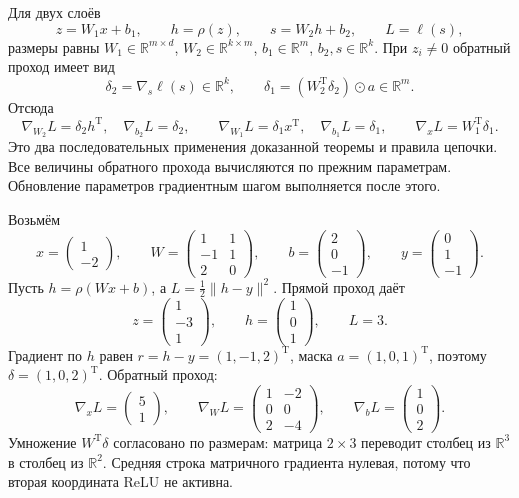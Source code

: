 Для двух слоёв
\[
 z=W_1x+b_1,\qquad h=\rho(z),\qquad s=W_2h+b_2,\qquad L=\ell(s),
\]
размеры равны
\(W_1\in\mathbb R^{m\times d}\), \(W_2\in\mathbb R^{k\times m}\),
\(b_1\in\mathbb R^m\), \(b_2,s\in\mathbb R^k\).
При \(z_i\ne0\) обратный проход имеет вид
\[
 \delta_2=\nabla_s\ell(s)\in\mathbb R^k,\qquad
 \delta_1=(W_2^{\mathrm T}\delta_2)\odot a\in\mathbb R^m.
\]
Отсюда
\[
 \nabla_{W_2}L=\delta_2h^{\mathrm T},\quad \nabla_{b_2}L=\delta_2,\qquad
 \nabla_{W_1}L=\delta_1x^{\mathrm T},\quad \nabla_{b_1}L=\delta_1,\qquad
 \nabla_xL=W_1^{\mathrm T}\delta_1.
\]
Это два последовательных применения доказанной теоремы и правила цепочки.
Все величины обратного прохода вычисляются по прежним параметрам.
Обновление параметров градиентным шагом выполняется после этого.

\begin{example}
Возьмём
\[
 x=\begin{pmatrix}1\\-2\end{pmatrix},\qquad
 W=\begin{pmatrix}1&1\\-1&1\\2&0\end{pmatrix},\qquad
 b=\begin{pmatrix}2\\0\\-1\end{pmatrix},\qquad
 y=\begin{pmatrix}0\\1\\-1\end{pmatrix}.
\]
Пусть \(h=\rho(Wx+b)\), а \(L=\frac{1}{2}\|h-y\|^2\).
Прямой проход даёт
\[
 z=\begin{pmatrix}1\\-3\\1\end{pmatrix},\qquad
 h=\begin{pmatrix}1\\0\\1\end{pmatrix},\qquad L=3.
\]
Градиент по \(h\) равен \(r=h-y=(1,-1,2)^{\mathrm T}\), маска
\(a=(1,0,1)^{\mathrm T}\), поэтому \(\delta=(1,0,2)^{\mathrm T}\).
Обратный проход:
\[
 \nabla_xL=\begin{pmatrix}5\\1\end{pmatrix},\qquad
 \nabla_WL=\begin{pmatrix}1&-2\\0&0\\2&-4\end{pmatrix},\qquad
 \nabla_bL=\begin{pmatrix}1\\0\\2\end{pmatrix}.
\]
Умножение \(W^{\mathrm T}\delta\) согласовано по размерам:
матрица \(2\times3\) переводит столбец из \(\mathbb R^3\) в столбец из \(\mathbb R^2\).
Средняя строка матричного градиента нулевая, потому что вторая координата ReLU не активна.
\end{example}
